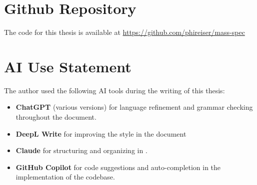 \section{Github Repository}
The code for this thesis is available at
\href{https://github.com/phireiser/mass-spec}{https://github.com/phireiser/mass-spec}

\section{AI Use Statement}
The author used the following AI tools during the writing of this thesis:
\begin{itemize}
    \item \textbf{ChatGPT} (various versions) for language refinement and grammar checking throughout the document.
    \item \textbf{DeepL Write} for improving the style in the document
    \item \textbf{Claude} for structuring and organizing in .
    \item \textbf{GitHub Copilot} for code suggestions and auto-completion in the implementation of the codebase.
\end{itemize}